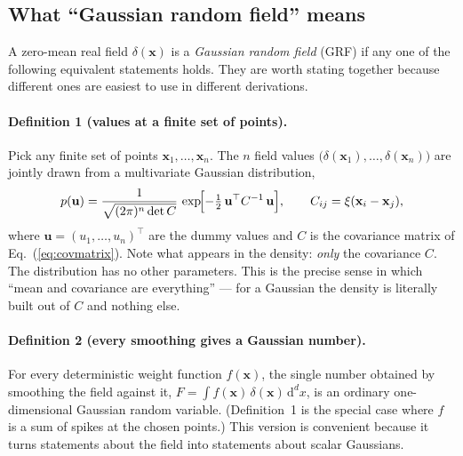 \documentclass[12pt]{article}
\newcommand{\bx}{\mathbf{x}}
\newcommand{\bu}{\mathbf{u}}
\begin{document}
\subsection{What ``Gaussian random field'' means}
\label{sec:grf-def}

A zero-mean real field $\delta(\bx)$ is a \emph{Gaussian random field}
(GRF) if any one of the following equivalent statements holds.  They are
worth stating together because different ones are easiest to use in
different derivations.

\paragraph{Definition 1 (values at a finite set of points).}
Pick any finite set of points $\bx_1, \dots, \bx_n$.  The $n$ field
values $\bigl(\delta(\bx_1), \dots, \delta(\bx_n)\bigr)$ are jointly
drawn from a multivariate Gaussian distribution,
\begin{equation}
  p(\bu) = \frac{1}{\sqrt{(2\pi)^n \det C}}\,
           \exp\!\Bigl[-\tfrac12\,\bu^\top C^{-1}\,\bu\Bigr],
  \qquad C_{ij} = \xi(\bx_i - \bx_j),
  \label{eq:mvg}
\end{equation}
where $\bu = (u_1,\dots,u_n)^\top$ are the dummy values and $C$ is the
covariance matrix of Eq.~(\ref{eq:covmatrix}).  Note what appears in the
density: \emph{only} the covariance $C$.  The distribution has no other
parameters.  This is the precise sense in which ``mean and covariance
are everything'' --- for a Gaussian the density is literally built out
of $C$ and nothing else.

\paragraph{Definition 2 (every smoothing gives a Gaussian number).}
For every deterministic weight function $f(\bx)$, the single number
obtained by smoothing the field against it,
$F = \int f(\bx)\,\delta(\bx)\,\mathrm d^d x$, is an ordinary
one-dimensional Gaussian random variable.  (Definition~1 is the special
case where $f$ is a sum of spikes at the chosen points.)  This version is
convenient because it turns statements about the field into statements
about scalar Gaussians.
\end{document}

